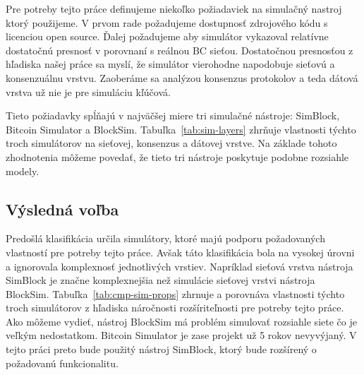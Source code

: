 Pre potreby tejto práce definujeme niekoľko požiadaviek na simulačný nastroj ktorý použijeme. V prvom rade požadujeme dostupnosť zdrojového kódu s licenciou open source. Ďalej požadujeme aby simulátor vykazoval relatívne dostatočnú presnosť v porovnaní s reálnou BC sieťou. Dostatočnou presnosťou z hľadiska našej práce sa myslí, že simulátor vierohodne napodobuje sieťovú a konsenzuálnu vrstvu. Zaoberáme sa analýzou konsenzus protokolov a teda dátová vrstva už nie je pre simuláciu kľúčová. 

Tieto požiadavky spĺňajú v najväčšej miere tri simulačné nástroje: SimBlock, Bitcoin Simulator a BlockSim. Tabuľka~\ref{tab:sim-layers} zhrňuje vlastnosti týchto troch simulátorov na sieťovej, konsenzus a dátovej vrstve. Na základe tohoto zhodnotenia môžeme povedať, že tieto tri nástroje poskytuje podobne rozsiahle modely.

\subsection{Výsledná voľba}

Predošlá klasifikácia určila simulátory, ktoré majú podporu požadovaných vlastností pre potreby tejto práce. Avšak táto klasifikácia bola na vysokej úrovni a ignorovala komplexnosť jednotlivých vrstiev. Napríklad sieťová vrstva nástroja SimBlock je značne komplexnejšia než simulácie sieťovej vrstvi nástroja BlockSim. Tabuľka~\ref{tab:cmp-sim-props} zhrnuje a porovnáva vlastnosti týchto troch simulátorov z hľadiska náročnosti rozšíriteľnosti pre potreby tejto práce. Ako môžeme vydieť, nástroj BlockSim má problém simulovať rozsiahle siete čo je veľkým nedostatkom. Bitcoin Simulator je zase projekt už 5 rokov nevyvýjaný. V tejto práci preto bude použitý nástroj SimBlock, ktorý bude rozšírený o požadovanú funkcionalitu. 


